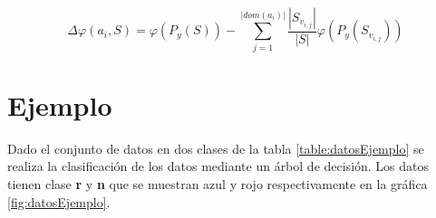 \documentclass[
10pt, %
a4paper, %
]{article}
\begin{document}
\begin{equation*}
\Delta\varphi (a_i,S) = \varphi\left(P_y(S)\right) - \sum_{j=1}^{|dom(a_i)|} \dfrac{|S_{v_{i,j}}|}{|S|}\varphi\left(P_y(S_{v_{i,j}})\right)
\end{equation*}




\section{Ejemplo}

Dado el conjunto de datos en dos clases de la tabla \ref{table:datosEjemplo} se realiza la clasificación de los datos mediante un árbol de decisión. 
Los datos tienen clase \textbf{r} y \textbf{n} que se muestran azul y rojo respectivamente en la gráfica \ref{fig:datosEjemplo}.
\end{document}
